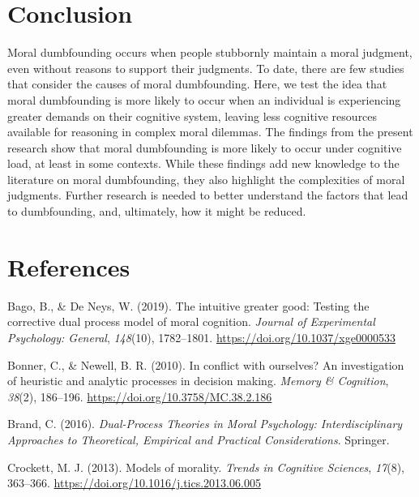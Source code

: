\documentclass[
  american,
  man,floatsintext]{apa7}
\begin{document}
\hypertarget{conclusion}{%
\section{Conclusion}\label{conclusion}}

Moral dumbfounding occurs when people stubbornly maintain a moral judgment, even without reasons to support their judgments. To date, there are few studies that consider the causes of moral dumbfounding. Here, we test the idea that moral dumbfounding is more likely to occur when an individual is experiencing greater demands on their cognitive system, leaving less cognitive resources available for reasoning in complex moral dilemmas. The findings from the present research show that moral dumbfounding is more likely to occur under cognitive load, at least in some contexts. While these findings add new knowledge to the literature on moral dumbfounding, they also highlight the complexities of moral judgments. Further research is needed to better understand the factors that lead to dumbfounding, and, ultimately, how it might be reduced.
\newpage


\hypertarget{references}{%
\section{References}\label{references}}

\setlength{\parindent}{-0.5in}
\setlength{\leftskip}{0.5in}
\setlength{\parskip}{8pt}

\hypertarget{refs}{}
\leavevmode\hypertarget{ref-bago_intuitive_2019}{}%
Bago, B., \& De Neys, W. (2019). The intuitive greater good: Testing the corrective dual process model of moral cognition. \emph{Journal of Experimental Psychology: General}, \emph{148}(10), 1782--1801. \url{https://doi.org/10.1037/xge0000533}

\leavevmode\hypertarget{ref-bonner_conflict_2010}{}%
Bonner, C., \& Newell, B. R. (2010). In conflict with ourselves? An investigation of heuristic and analytic processes in decision making. \emph{Memory \& Cognition}, \emph{38}(2), 186--196. \url{https://doi.org/10.3758/MC.38.2.186}

\leavevmode\hypertarget{ref-brand_dualprocess_2016}{}%
Brand, C. (2016). \emph{Dual-Process Theories in Moral Psychology: Interdisciplinary Approaches to Theoretical, Empirical and Practical Considerations}. Springer.

\leavevmode\hypertarget{ref-crockett_models_2013}{}%
Crockett, M. J. (2013). Models of morality. \emph{Trends in Cognitive Sciences}, \emph{17}(8), 363--366. \url{https://doi.org/10.1016/j.tics.2013.06.005}
\end{document}
